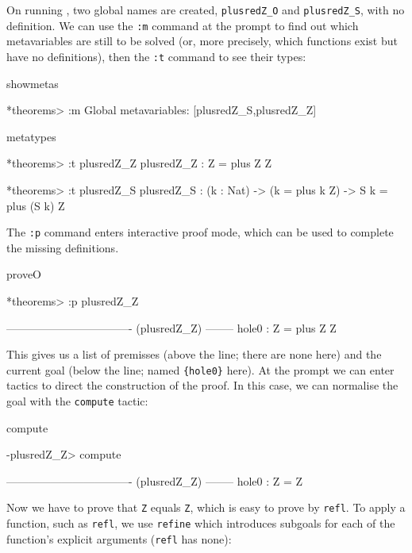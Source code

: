 \noindent
On running \Idris{}, two global names are created, \texttt{plusredZ\_O} and
\texttt{plusredZ\_S}, with no definition. We can use the \texttt{:m} command
at the prompt to find out which metavariables are still to be solved (or, more
precisely, which functions exist but have no definitions), then the
\texttt{:t} command to see their types:

\begin{SaveVerbatim}{showmetas}

*theorems> :m 
Global metavariables:
        [plusredZ_S,plusredZ_Z]

\end{SaveVerbatim}

\begin{SaveVerbatim}{metatypes}

*theorems> :t plusredZ_Z
plusredZ_Z : Z = plus Z Z

*theorems> :t plusredZ_S
plusredZ_S : (k : Nat) -> (k = plus k Z) -> S k = plus (S k) Z

\end{SaveVerbatim}


\noindent
The \texttt{:p} command enters interactive proof mode, which can be used to complete
the missing definitions.

\begin{SaveVerbatim}{proveO}

*theorems> :p plusredZ_Z

---------------------------------- (plusredZ_Z) --------
{hole0} : Z = plus Z Z

\end{SaveVerbatim}

\noindent
This gives us a list of premisses 
(above the line; there are none here) and the current goal (below the line;
named \texttt{\{hole0\}} here).
At the prompt we can enter tactics to direct the construction of the proof. In this case,
we can normalise the goal with the \texttt{compute} tactic:

\begin{SaveVerbatim}{compute}

-plusredZ_Z> compute

---------------------------------- (plusredZ_Z) --------
{hole0} : Z = Z

\end{SaveVerbatim}

\noindent
Now we have to prove that \texttt{Z} equals \texttt{Z}, which is easy to prove by
\texttt{refl}. To apply a function, such as \texttt{refl}, we use \texttt{refine} 
which introduces subgoals for each of the function's explicit arguments (\texttt{refl}
has none):

